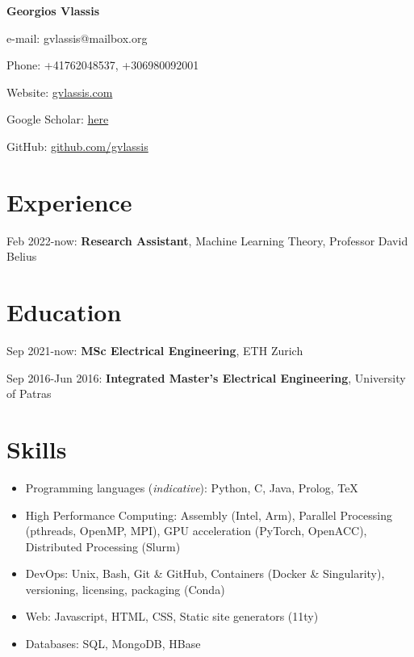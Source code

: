 \documentclass{article}
\begin{document}
\begin{Center}

	{\LARGE \bfseries \color{primary} Georgios Vlassis \par}

	{\large \color{secondary} e-mail: gvlassis@mailbox.org \par}

	{\large \color{secondary} Phone: +41762048537, +306980092001 \par}

	{\large \color{secondary} Website: \href{https://gvlassis.com/}{gvlassis.com} \par}

	{\large \color{secondary} Google Scholar: \href{https://scholar.google.com/citations?user=wIPwiSoAAAAJ&hl=en}{here} \par}

	{\large \color{secondary} GitHub: \href{https://github.com/gvlassis}{github.com/gvlassis} \par}


\end{Center}

\section*{Experience}
Feb 2022-now: \textbf{Research Assistant}, Machine Learning Theory, Professor David Belius

\section*{Education}
Sep 2021-now: \textbf{MSc Electrical Engineering}, ETH Zurich


Sep 2016-Jun 2016: \textbf{Integrated Master's Electrical Engineering}, University of Patras

\section*{Skills}
\begin{itemize}
	\item Programming languages (\textit{indicative}): Python, C, Java, Prolog, \TeX
	\item High Performance Computing: Assembly (Intel, Arm), Parallel Processing (pthreads, OpenMP, MPI), GPU acceleration (PyTorch, OpenACC), Distributed Processing (Slurm)
	\item DevOps: Unix, Bash, Git \& GitHub, Containers (Docker \& Singularity), versioning, licensing, packaging (Conda)
	\item Web: Javascript, HTML, CSS, Static site generators (11ty)
	\item Databases: SQL, MongoDB, HBase
\end{itemize}
\end{document}
